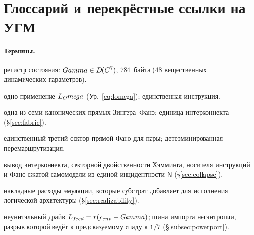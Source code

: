\section{Глоссарий и перекрёстные ссылки на УГМ}
\label{app:glossary}

\paragraph{Термины.}
\begin{description}[leftmargin=0pt,itemsep=1pt]
  \item[\DM{}] регистр состояния: $Gamma\in D(C^7)$, $784$~байта ($48$ вещественных динамических параметров).
  \item[Тик] одно применение $L_Omega$ (Ур.~\ref{eq:lomega}); единственная инструкция.
  \item[Линие-шина] одна из семи канонических прямых Зингера--Фано; единица интерконнекта (\S\ref{sec:fabric}).
  \item[Медиатор $k^\ast(i,j)$] единственный третий сектор прямой Фано для пары; детерминированная перемаршрутизация.
  \item[Коллапс] вывод интерконнекта, секторной двойственности Хэмминга, носителя инструкций и Фано-сжатой самомодели из единой инцидентности $\mathsf{N}$ (\S\ref{sec:collapse}).
  \item[Импеданс] накладные расходы эмуляции, которые субстрат добавляет для исполнения логической архитектуры (\S\ref{sec:realizability}).
  \item[Порт питания] неунитальный драйв $L_{feed}=r(\rho_{env}-Gamma)$; шина импорта негэнтропии, разрыв которой ведёт к предсказуемому спаду к $\mathbb{1}/7$ (\S\ref{subsec:powerport}).
\end{description}

